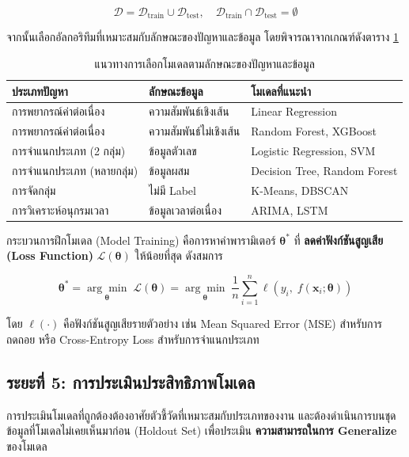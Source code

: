 \[
    \mathcal{D} = \mathcal{D}_{\text{train}} \cup \mathcal{D}_{\text{test}}, \quad
    \mathcal{D}_{\text{train}} \cap \mathcal{D}_{\text{test}} = \emptyset
\]

\noindent
จากนั้นเลือกอัลกอริทึมที่เหมาะสมกับลักษณะของปัญหาและข้อมูล โดยพิจารณาจากเกณฑ์ดังตาราง \ref{T:model_selection_guide}

\begin{table}[h]
\centering
\caption{แนวทางการเลือกโมเดลตามลักษณะของปัญหาและข้อมูล}
\label{T:model_selection_guide}
\begin{tabular}{|l|l|l|}
\hline
\textbf{ประเภทปัญหา} & \textbf{ลักษณะข้อมูล} & \textbf{โมเดลที่แนะนำ} \\ \hline
การพยากรณ์ค่าต่อเนื่อง & ความสัมพันธ์เชิงเส้น & Linear Regression \\ \hline
การพยากรณ์ค่าต่อเนื่อง & ความสัมพันธ์ไม่เชิงเส้น & Random Forest, XGBoost \\ \hline
การจำแนกประเภท (2 กลุ่ม) & ข้อมูลตัวเลข & Logistic Regression, SVM \\ \hline
การจำแนกประเภท (หลายกลุ่ม) & ข้อมูลผสม & Decision Tree, Random Forest \\ \hline
การจัดกลุ่ม & ไม่มี Label & K-Means, DBSCAN \\ \hline
การวิเคราะห์อนุกรมเวลา & ข้อมูลเวลาต่อเนื่อง & ARIMA, LSTM \\ \hline
\end{tabular}
\end{table}

กระบวนการฝึกโมเดล (Model Training) คือการหาค่าพารามิเตอร์ $\boldsymbol{\theta}^*$ ที่ \textbf{ลดค่าฟังก์ชันสูญเสีย (Loss Function)} $\mathcal{L}(\boldsymbol{\theta})$ ให้น้อยที่สุด ดังสมการ

\[
    \boldsymbol{\theta}^* = \underset{\boldsymbol{\theta}}{\arg\min} \; \mathcal{L}(\boldsymbol{\theta}) = \underset{\boldsymbol{\theta}}{\arg\min} \; \frac{1}{n}\sum_{i=1}^{n} \ell\!\left(y_i,\; f(\mathbf{x}_i; \boldsymbol{\theta})\right)
\]

\noindent
โดย $\ell(\cdot)$ คือฟังก์ชันสูญเสียรายตัวอย่าง เช่น Mean Squared Error (MSE) สำหรับการถดถอย หรือ Cross-Entropy Loss สำหรับการจำแนกประเภท

\subsection{ระยะที่ 5: การประเมินประสิทธิภาพโมเดล}
การประเมินโมเดลที่ถูกต้องต้องอาศัยตัวชี้วัดที่เหมาะสมกับประเภทของงาน และต้องดำเนินการบนชุดข้อมูลที่โมเดลไม่เคยเห็นมาก่อน (Holdout Set) เพื่อประเมิน \textbf{ความสามารถในการ Generalize} ของโมเดล

